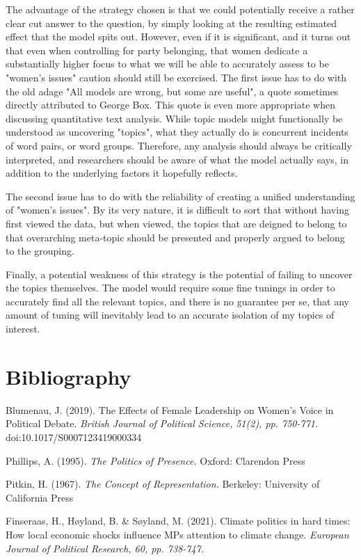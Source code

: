 \documentclass[12pt]{article}
\begin{document}
	The advantage of the strategy chosen is that we could potentially receive a rather clear cut answer to the question, by simply looking at the resulting estimated effect that the model spits out. However, even if it is significant, and it turns out that even when controlling for party belonging, that women dedicate a substantially higher focus to what we will be able to accurately assess to be "women's issues" caution should still be exercised. The first issue has to do with the old adage "All models are wrong, but some are useful", a quote sometimes directly attributed to George Box. This quote is even more appropriate when discussing quantitative text analysis. While topic models might functionally be understood as uncovering "topics", what they actually do is concurrent incidents of word pairs, or word groups. Therefore, any analysis should always be critically interpreted, and researchers should be aware of what the model actually says, in addition to the underlying factors it hopefully reflects.
	
	The second issue has to do with the reliability of creating a unified understanding of "women's issues". By its very nature, it is difficult to sort that without having first viewed the data, but when viewed, the topics that are deigned to belong to that overarching meta-topic should be presented and properly argued to belong to the grouping. 
	
	Finally, a potential weakness of this strategy is the potential of failing to uncover the topics themselves. The model would require some fine tunings in order to accurately find all the relevant topics, and there is no guarantee per se, that any amount of tuning will inevitably lead to an accurate isolation of my topics of interest. 
	
	\section{Bibliography}
	
	{\parindent-10pt
		Blumenau, J. (2019). The Effects of Female Leadership on Women’s Voice in
		Political Debate. \textit{British Journal of Political Science, 51(2), pp. 750-771.} doi:10.1017/S0007123419000334 
		
		Phillips, A. (1995). \textit{The Politics of Presence.} Oxford: Clarendon Press
		
		Pitkin, H. (1967). \textit{The Concept of Representation.} Berkeley: University of California Press
		
		Finseraas, H., Høyland, B. \& Søyland, M. (2021). Climate politics in hard times: How local economic shocks influence MPs attention to climate change. \textit{European Journal of Political Research, 60, pp. 738-747.}
	}
	
\end{document}
